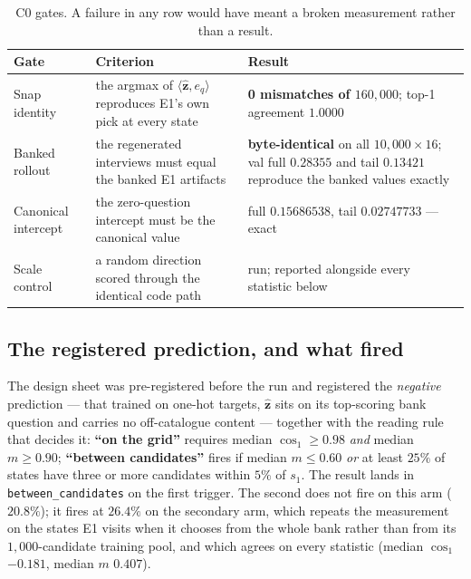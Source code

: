 \documentclass[11pt]{article}
\newcommand{\zz}{\mathbf{z}}
\newcommand{\zhat}{\hat{\zz}}
\begin{document}
\begin{table}[h]
\centering\small
\begin{tabular}{@{}p{}p{}p{}@{}}
\toprule
\textbf{Gate} & \textbf{Criterion} & \textbf{Result} \\
\midrule
Snap identity & the argmax of $\langle\zhat,e_q\rangle$ reproduces E1's own pick at every state &
\textbf{0 mismatches of $160{,}000$}; top-1 agreement $1.0000$ \\
Banked rollout & the regenerated interviews must equal the banked E1 artifacts &
\textbf{byte-identical} on all $10{,}000\times16$; val full $0.28355$ and tail $0.13421$ reproduce
the banked values exactly \\
Canonical intercept & the zero-question intercept must be the canonical value &
full $0.15686538$, tail $0.02747733$ --- exact \\
Scale control & a random direction scored through the identical code path & run; reported alongside
every statistic below \\
\bottomrule
\end{tabular}
\caption{C0 gates. A failure in any row would have meant a broken measurement rather than a result.}
\label{tab:c0gates}
\end{table}

\subsection{The registered prediction, and what fired}

The design sheet was pre-registered before the run and registered the \emph{negative} prediction ---
that trained on one-hot targets, $\zhat$ sits on its top-scoring bank question and carries no
off-catalogue content --- together with the reading rule that decides it: \textbf{``on the grid''}
requires median $\cos_1 \ge 0.98$ \emph{and} median $m \ge 0.90$; \textbf{``between candidates''}
fires if median $m \le 0.60$ \emph{or} at least $25\%$ of states have three or more candidates within
$5\%$ of $s_1$. The result lands in \texttt{between\_candidates} on the first trigger. The second does
not fire on this arm ($20.8\%$); it fires at $26.4\%$ on the secondary arm, which repeats the
measurement on the states E1 visits when it chooses from the whole bank rather than from its
$1{,}000$-candidate training pool, and which agrees on every statistic (median $\cos_1$ $-0.181$,
median $m$ $0.407$).
\end{document}
